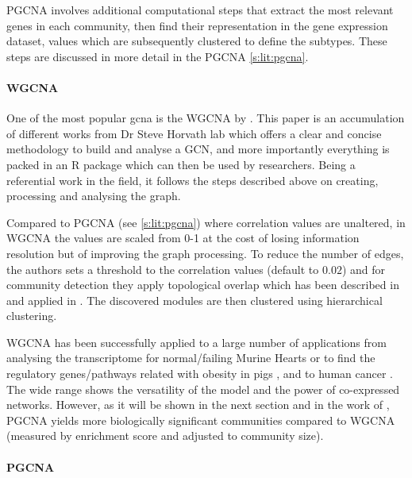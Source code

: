 \gls{PGCNA} involves additional computational steps that extract the most relevant genes in each community, then find their representation in the gene expression dataset, values which are subsequently clustered to define the subtypes. These steps are discussed in more detail in the PGCNA \cref{s:lit:pgcna}.


\paragraph*{WGCNA} \label{s:lit:WGCNA}

One of the most popular \acrfull{gcna} is the WGCNA by \citet{Langfelder2008-sn}. This paper is an accumulation of different works from Dr Steve Horvath lab which offers a clear and concise methodology to build and analyse a GCN, and more importantly everything is packed in an R package which can then be used by researchers. Being a referential work in the field, it follows the steps described above on creating, processing and analysing the graph.

Compared to PGCNA (see \cref{s:lit:pgcna}) where correlation values are unaltered, in WGCNA the values are scaled from 0-1 at the cost of losing information resolution but of improving the graph processing. To reduce the number of edges, the authors sets a threshold to the correlation values (default to $0.02$) and for community detection they apply topological overlap which has been described in \cite{Zhang2005-xq} and applied in \citep{Yip2007-mr, Li2007-vz, Ravasz2002-au}. The discovered modules are then clustered using hierarchical clustering.

\gls{WGCNA} has been successfully applied to a large number of applications from analysing the transcriptome for normal/failing Murine Hearts \citep{Lee2011-wm} or to find the regulatory genes/pathways related with obesity in pigs \citep{Kogelman2014-ea}, and to human cancer \citep{Yang2014-wv, Clarke2013-wd, Care2019-ij}. The wide range shows the versatility of the model and the power of co-expressed networks. However, as it will be shown in the next section and in the work of \citet{Care2019-ij}, PGCNA yields more biologically significant communities compared to WGCNA (measured by enrichment score and adjusted to community size).

\paragraph*{PGCNA} \label{s:lit:pgcna}

